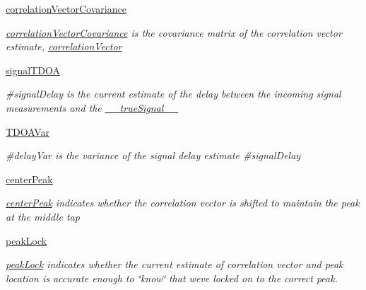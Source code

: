 \begin{DoxyCompactItemize}
\hyperlink{classmodest_1_1substates_1_1correlationvector_1_1CorrelationVector_a03bf36ec74d2fa70eeec14da348bec0c}{correlation\+Vector\+Covariance}
\begin{DoxyCompactList}\small\item\em \hyperlink{classmodest_1_1substates_1_1correlationvector_1_1CorrelationVector_a03bf36ec74d2fa70eeec14da348bec0c}{correlation\+Vector\+Covariance} is the covariance matrix of the correlation vector estimate, \hyperlink{classmodest_1_1substates_1_1correlationvector_1_1CorrelationVector_a81da583ee9077067b6aaa354fd8a8c49}{correlation\+Vector} \end{DoxyCompactList}\item 
\hyperlink{classmodest_1_1substates_1_1correlationvector_1_1CorrelationVector_a95b97079287af509a5132e15e6107781}{signal\+T\+D\+OA}
\begin{DoxyCompactList}\small\item\em \#signal\+Delay is the current estimate of the delay between the incoming signal measurements and the \hyperlink{classmodest_1_1substates_1_1correlationvector_1_1CorrelationVector_af2f52cea1c695f36dd100f529c322e94}{\+\_\+\+\_\+true\+Signal\+\_\+\+\_\+} \end{DoxyCompactList}\item 
\hyperlink{classmodest_1_1substates_1_1correlationvector_1_1CorrelationVector_a947c6d7fe9d0fffbb1e33e8dc0203bd9}{T\+D\+O\+A\+Var}
\begin{DoxyCompactList}\small\item\em \#delay\+Var is the variance of the signal delay estimate \#signal\+Delay \end{DoxyCompactList}\item 
\hyperlink{classmodest_1_1substates_1_1correlationvector_1_1CorrelationVector_a9dbc1cdcfab963b133537b54f0a6d7a6}{center\+Peak}
\begin{DoxyCompactList}\small\item\em \hyperlink{classmodest_1_1substates_1_1correlationvector_1_1CorrelationVector_a9dbc1cdcfab963b133537b54f0a6d7a6}{center\+Peak} indicates whether the correlation vector is shifted to maintain the peak at the middle tap \end{DoxyCompactList}\item 
\hyperlink{classmodest_1_1substates_1_1correlationvector_1_1CorrelationVector_aefa1ac05666047998606ffd9f7d984ab}{peak\+Lock}
\begin{DoxyCompactList}\small\item\em \hyperlink{classmodest_1_1substates_1_1correlationvector_1_1CorrelationVector_aefa1ac05666047998606ffd9f7d984ab}{peak\+Lock} indicates whether the current estimate of correlation vector and peak location is accurate enough to \char`\"{}know\char`\"{} that we\textquotesingle{}ve locked on to the correct peak. \end{DoxyCompactList}\item 

\end{DoxyCompactItemize}
